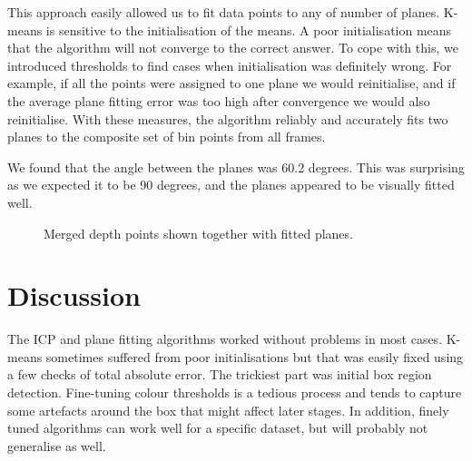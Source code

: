 \documentclass[12pt,a4paper,onecolumn]{article}
\begin{document}
This approach easily allowed us to fit data points to any of number of
planes.  K-means is sensitive to the initialisation of the means.  A poor initialisation means that the algorithm will not converge to the correct answer.  To cope with this, we introduced thresholds
to find cases when initialisation was definitely wrong.  For example, if all the points were assigned to one plane we would reinitialise, and if the average plane fitting error was too high after convergence we would also reinitialise.  With these measures, the algorithm reliably and accurately fits two planes to the composite set of bin points from all frames.

We found that the angle between the planes was 60.2 degrees.  This was surprising as we expected it to be 90 degrees, and the planes appeared to be visually fitted well.

\begin{figure}[h]
    \centering
      \caption{Merged depth points shown together with fitted planes.}
\end{figure}

\section{Discussion}
The ICP and plane fitting algorithms worked without problems in most cases. K-means sometimes suffered
from poor initialisations but that was easily fixed using a few checks of total
absolute error. The trickiest part was initial box
region detection. Fine-tuning colour thresholds is a tedious
process and tends to capture some artefacts around the box
that might affect later stages.  In addition, finely tuned algorithms can work well for a specific dataset, but will probably not generalise as well.
\end{document}
